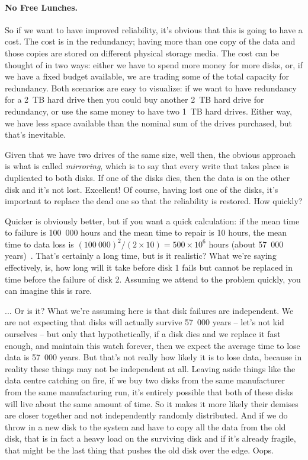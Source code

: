 \paragraph{No Free Lunches.} So if we want to have improved reliability, it's obvious that this is going to have a cost. The cost is in the redundancy; having more than one copy of the data and those copies are stored on different physical storage media. The cost can be thought of in two ways: either we have to spend more money for more disks, or, if we have a fixed budget available, we are trading some of the total capacity for redundancy.  Both scenarios are easy to visualize: if we want to have redundancy for a 2~TB hard drive then you could buy another 2~TB hard drive for redundancy, or use the same money to have two 1~TB hard drives. Either way, we have less space available than the nominal sum of the drives purchased, but that's inevitable.

Given that we have two drives of the same size, well then, the obvious approach is what is called \textit{mirroring}, which is to say that every write that takes place is duplicated to both disks. If one of the disks dies, then the data is on the other disk and it's not lost. Excellent! Of course, having lost one of the disks, it's important to replace the dead one so that the reliability is restored. How quickly?

Quicker is obviously better, but if you want a quick calculation: if the mean time to failure is 100~000 hours and the mean time to repair is 10 hours, the mean time to data loss is $(100~000)^{2}/(2 \times 10) = 500 \times 10^{6}$ hours (about 57~000 years)~\cite{osc}. That's certainly a long time, but is it realistic? What we're saying effectively, is, how long will it take before disk 1 fails but cannot be replaced in time before the failure of disk 2. Assuming we attend to the problem quickly, you can imagine this is rare.

... Or is it? What we're assuming here is that disk failures are independent. We are not expecting that disks will actually survive 57~000 years -- let's not kid ourselves -- but only that hypothetically, if a disk dies and we replace it fast enough, and maintain this watch forever, then we expect the average time to lose data is 57~000 years. But that's not really how likely it is to lose data, because in reality these things may not be independent at all. Leaving aside things like the data centre catching on fire, if we buy two disks from the same manufacturer from the same manufacturing run, it's entirely possible that both of these disks will live about the same amount of time. So it makes it more likely their demises are closer together and not independently randomly distributed. And if we do throw in a new disk to the system and have to copy all the data from the old disk, that is in fact a heavy load on the surviving disk and if it's already fragile, that might be the last thing that pushes the old disk over the edge. Oops.

